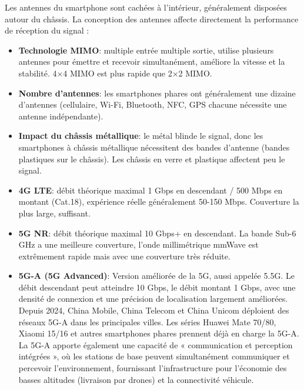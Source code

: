 
Les antennes du smartphone sont cachées à l'intérieur, généralement disposées autour du châssis. La conception des antennes affecte directement la performance de réception du signal :

\begin{itemize}
  \item \textbf{Technologie MIMO}: multiple entrée multiple sortie, utilise plusieurs antennes pour émettre et recevoir simultanément, améliore la vitesse et la stabilité. 4×4 MIMO est plus rapide que 2×2 MIMO.
  \item \textbf{Nombre d'antennes}: les smartphones phares ont généralement une dizaine d'antennes (cellulaire, Wi-Fi, Bluetooth, NFC, GPS chacune nécessite une antenne indépendante).
  \item \textbf{Impact du châssis métallique}: le métal blinde le signal, donc les smartphones à châssis métallique nécessitent des bandes d'antenne (bandes plastiques sur le châssis). Les châssis en verre et plastique affectent peu le signal.
\end{itemize}


\begin{itemize}
  \item \textbf{4G LTE}: débit théorique maximal 1 Gbps en descendant / 500 Mbps en montant (Cat.18), expérience réelle généralement 50-150 Mbps. Couverture la plus large, suffisant.
  \item \textbf{5G NR}: débit théorique maximal 10 Gbps+ en descendant. La bande Sub-6 GHz a une meilleure couverture, l'onde millimétrique mmWave est extrêmement rapide mais avec une couverture très réduite.
  \item \textbf{5G-A (5G Advanced)}: Version améliorée de la 5G, aussi appelée 5.5G. Le débit descendant peut atteindre 10 Gbps, le débit montant 1 Gbps, avec une densité de connexion et une précision de localisation largement améliorées. Depuis 2024, China Mobile, China Telecom et China Unicom déploient des réseaux 5G-A dans les principales villes. Les séries Huawei Mate 70/80, Xiaomi 15/16 et autres smartphones phares prennent déjà en charge la 5G-A. La 5G-A apporte également une capacité de « communication et perception intégrées », où les stations de base peuvent simultanément communiquer et percevoir l'environnement, fournissant l'infrastructure pour l'économie des basses altitudes (livraison par drones) et la connectivité véhicule.
\end{itemize}

